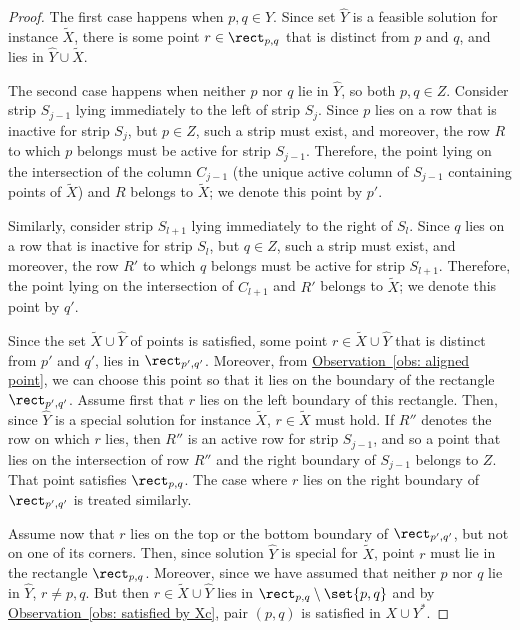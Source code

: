 \documentclass[11pt]{article}
\numberwithin{equation}{section}
\theoremstyle{definition}
\theoremstyle{plain}
\newcommand{\expref}[2]{\hyperref[#2]{#1~\ref{#2}}}
\begin{document}
\begin{proof}
The first case happens when $p,q\in \hat Y$. Since set $\hat Y$ is a feasible solution for instance $\widetilde{X}$, there is some point $r\in \rect_{p,q}$ that is distinct from $p$ and $q$, and lies in $\hat Y\cup \widetilde{X}$. %
%


The second case happens when neither $p$ nor $q$ lie in $\hat Y$, so both $p,q\in Z$. Consider strip $S_{j-1}$ lying immediately to the left of strip $S_j$. Since $p$ lies on a row that is inactive for strip $S_j$, but $p\in Z$, such a strip must exist, and moreover, the row $R$ to which $p$ belongs must be active for strip $S_{j-1}$. Therefore, the point lying on the intersection of the column $C_{j-1}$ (the unique active column of $S_{j-1}$ containing points of $\widetilde{X}$) and $R$ belongs to $\widetilde{X}$; we denote this point by $p'$. 

Similarly, consider strip $S_{l+1}$ lying immediately to the right of $S_l$. Since $q$ lies on a row that is inactive for strip $S_l$, but $q\in Z$, such a strip must exist, and moreover, the row $R'$ to which $q$ belongs must be active for strip $S_{l+1}$. Therefore, the point lying on the intersection of $C_{l+1}$ and $R'$ belongs to $\widetilde{X}$; we denote this point by $q'$.

Since the set $\widetilde{X}\cup \hat Y$ of points is satisfied, some point $r\in \widetilde{X}\cup \hat Y$ that is distinct from $p'$ and $q'$, lies in $\rect_{p',q'}$. Moreover, from \expref{Observation}{obs: aligned point}, we can choose this point so that it lies on the boundary of the rectangle $\rect_{p',q'}$. Assume first that $r$ lies on the left boundary of this rectangle. Then, since $\hat Y$ is a special solution for instance $\widetilde{X}$, $r\in \widetilde{X}$ must hold. If $R''$ denotes the row on which $r$ lies, then $R''$ is an active row for strip $S_{j-1}$, and so a point that lies on the intersection of row $R''$ and the right boundary of $S_{j-1}$ belongs to $Z$. That point satisfies $\rect_{p,q}$. The case where $r$ lies on the right boundary of $\rect_{p',q'}$ is treated similarly.

Assume now that $r$ lies on the top or the bottom boundary of $\rect_{p',q'}$, but not on one of its corners. Then, since solution $\hat Y$ is special for $\widetilde{X}$, point $r$ must lie in the rectangle $\rect_{p,q}$. Moreover, since we have assumed that neither $p$ nor $q$ lie in $\hat Y$, $r\neq p,q$. But then $r\in \widetilde{X}\cup \hat Y$ lies in $\rect_{p,q}\setminus\set{p,q}$ and by \expref{Observation}{obs: satisfied by Xc}, pair $(p,q)$ is satisfied in $X\cup Y^*$.




\end{proof}
\end{document}
